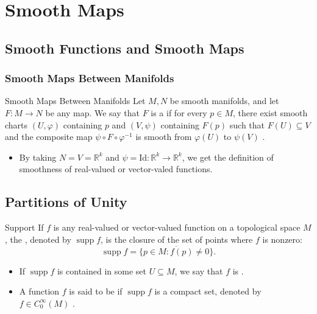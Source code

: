\documentclass[../main.tex]{subfiles}
\begin{document}
\ifSubfilesClassLoaded{

    \tableofcontents
    
}{}

\chapter{ Smooth Maps }

\section{Smooth Functions and Smooth Maps}

\subsection{Smooth Maps Between Manifolds}

\begin{definition}{Smooth Maps Between Manifolds}{}
    Let $M, N$ be smooth manifolds, and let $F: M \to N$ be any map. We say that $F$ is a  if for every $p \in M$, there exist smooth charts $(U, \varphi)$ containing $p$ and $(V, \psi)$ containing $F(p)$ such that $F(U) \subseteq V$ and the composite map $\psi \circ F \circ \varphi^{-1}$ is smooth from $\varphi(U)$ to $\psi(V)$ .
\end{definition}

\begin{remark}
    \begin{itemize}
        \item By taking \(  N= V= \mathbb{R} ^{k}  \) and \(  \psi =\mathrm{Id}:\mathbb{R} ^{k}\to \mathbb{R} ^{k}  \), we get the definition of smoothness of real-valued or vector-valed functions.  
    \end{itemize}
    
\end{remark}



\section{Partitions of Unity}
\begin{definition}{Support}{}
    If $f$ is any real-valued or vector-valued function on a topological space $M$, the , denoted by $\operatorname{supp} f$, is the closure of the set of points where $f$ is nonzero:
\[
\operatorname{supp} f = \overline{\{p \in M : f(p) \neq 0\}}.
\]\begin{itemize}
    \item If $\operatorname{supp} f$ is contained in some set $U \subseteq M$, we say that $f$ is . 
    \item 
A function $f$ is said to be  if $\operatorname{supp} f$ is a compact set, denoted by \(  f \in C_{0}^{\infty}\left( M \right)   \) . 
\end{itemize}
\end{definition}
\end{document}
